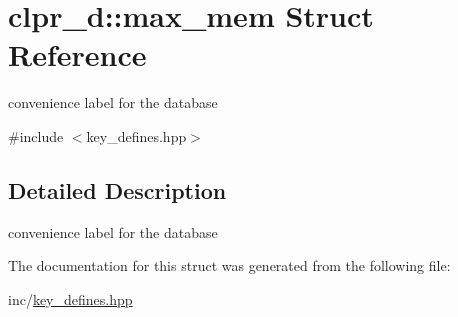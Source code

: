 \hypertarget{structclpr__d_1_1max__mem}{\section{clpr\-\_\-d\-:\-:max\-\_\-mem \-Struct \-Reference}
\label{structclpr__d_1_1max__mem}
}


convenience label for the database  




{\ttfamily \#include $<$key\-\_\-defines.\-hpp$>$}



\subsection{\-Detailed \-Description}
convenience label for the database 

\-The documentation for this struct was generated from the following file\-:\begin{DoxyCompactItemize}
\item 
inc/\hyperlink{key__defines_8hpp}{key\-\_\-defines.\-hpp}\end{DoxyCompactItemize}
